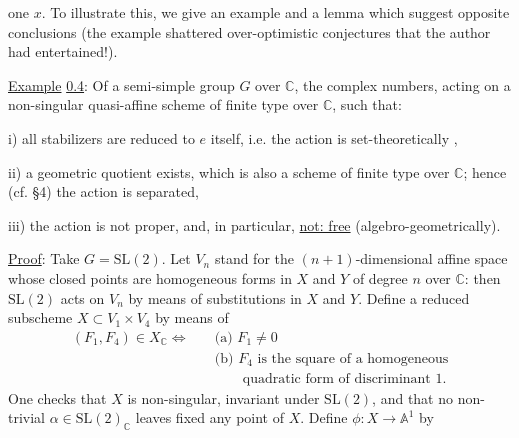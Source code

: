 
one $x$. To illustrate this, we give an example and a lemma which suggest opposite conclusions (the example shattered over-optimistic conjectures that the author had entertained!).

\uline{Example} \uline{0.4}: Of a semi-simple group $G$ over $\mathbb C$, the complex numbers, acting on a non-singular quasi-affine scheme of finite type over $\mathbb C$, such that:

i) all stabilizers are reduced to $e$ itself, i.e. the action is set-theoretically ,

ii) a geometric quotient exists, which is also a scheme of finite type over $\mathbb C$; hence (cf. \S4) the action is separated,

iii) the action is not proper, and, in particular, \uline{not: free} (algebro-geometrically).

\uline{Proof}: Take $G=\mathrm{SL}(2)$. Let $V_n$ stand for the $(n+1)$-dimensional affine space whose closed points are homogeneous forms in $X$ and $Y$ of degree $n$ over $\mathbb C$: then $\mathrm{SL}(2)$ acts on $V_n$ by means of substitutions in $X$ and $Y$. Define a reduced subscheme $X\subset V_1\times V_4$ by means of
\[
\begin{aligned}
(F_1,F_4)\in X_{\mathbb C}\Longleftrightarrow\quad &\text{(a) }F_1\ne0\\
&\text{(b) }F_4\text{ is the square of a homogeneous}\\
&\qquad\text{quadratic form of discriminant }1.
\end{aligned}
\]
One checks that $X$ is non-singular, invariant under $\mathrm{SL}(2)$, and that no non-trivial $\alpha\in \mathrm{SL}(2)_{\mathbb C}$ leaves fixed any point of $X$. Define $\phi:X\longrightarrow\mathbb A^1$ by
